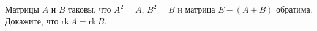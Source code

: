 \documentclass{article}
\begin{document}
Матрицы $A$ и $B$ таковы, что $A^2 = A$, $B^2 = B$ и матрица $E - (A+B)$ обратима. Докажите, что $\text{rk}\,A = \text{rk}\,B$.
\end{document}
